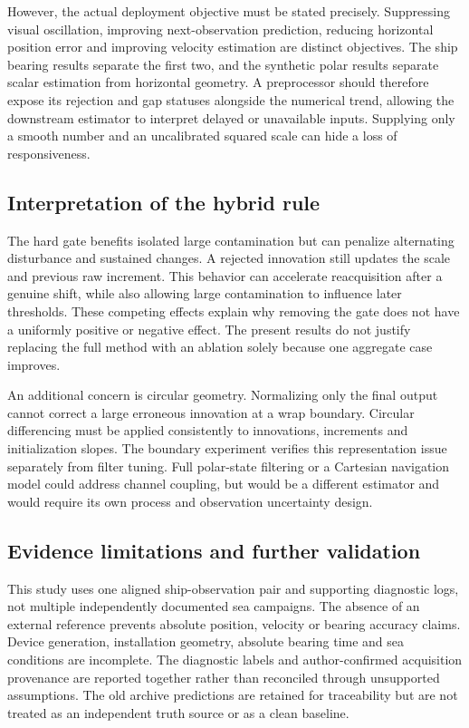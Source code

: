 \documentclass[12pt,a4paper]{article}
\begin{document}
However, the actual deployment objective must be stated precisely. Suppressing visual oscillation, improving next-observation prediction, reducing horizontal position error and improving velocity estimation are distinct objectives. The ship bearing results separate the first two, and the synthetic polar results separate scalar estimation from horizontal geometry. A preprocessor should therefore expose its rejection and gap statuses alongside the numerical trend, allowing the downstream estimator to interpret delayed or unavailable inputs. Supplying only a smooth number and an uncalibrated squared scale can hide a loss of responsiveness.

\subsection{Interpretation of the hybrid rule}
The hard gate benefits isolated large contamination but can penalize alternating disturbance and sustained changes. A rejected innovation still updates the scale and previous raw increment. This behavior can accelerate reacquisition after a genuine shift, while also allowing large contamination to influence later thresholds. These competing effects explain why removing the gate does not have a uniformly positive or negative effect. The present results do not justify replacing the full method with an ablation solely because one aggregate case improves.

An additional concern is circular geometry. Normalizing only the final output cannot correct a large erroneous innovation at a wrap boundary. Circular differencing must be applied consistently to innovations, increments and initialization slopes. The boundary experiment verifies this representation issue separately from filter tuning. Full polar-state filtering or a Cartesian navigation model could address channel coupling, but would be a different estimator and would require its own process and observation uncertainty design.

\subsection{Evidence limitations and further validation}
This study uses one aligned ship-observation pair and supporting diagnostic logs, not multiple independently documented sea campaigns. The absence of an external reference prevents absolute position, velocity or bearing accuracy claims. Device generation, installation geometry, absolute bearing time and sea conditions are incomplete. The diagnostic labels and author-confirmed acquisition provenance are reported together rather than reconciled through unsupported assumptions. The old archive predictions are retained for traceability but are not treated as an independent truth source or as a clean baseline.
\end{document}
